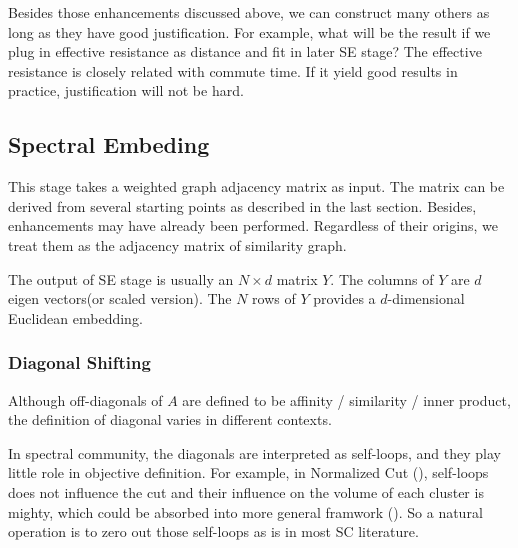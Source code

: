 
Besides those enhancements discussed above, we can construct many others
as long as they have good justification. 
For example, what will be the result if we plug in effective 
resistance as distance and fit in later SE stage? The effective 
resistance is closely related with commute time\cite{lau-2012-spectral-ln}. 
If it yield good results in practice, justification will not 
be hard. 



\subsection{Spectral Embeding}
\label{sec:se}

This stage takes a weighted graph adjacency matrix as input. 
The matrix can be derived from several starting points as 
described in the last section. Besides, enhancements may 
have already been performed. Regardless of their origins, 
we treat them as the adjacency matrix of similarity graph. 

The output of SE stage is usually an $ N \times d $ matrix $ Y $.
The columns of $ Y $ are $ d $ eigen vectors(or scaled version). 
The $ N $ rows of $ Y $ provides a $ d $-dimensional Euclidean 
embedding. 

\subsubsection{Diagonal Shifting}
\label{sec:diags}

Although off-diagonals of $A$ are defined to be affinity / similarity / 
inner product, the definition of diagonal varies in different contexts. 

In spectral community, the diagonals are interpreted as self-loops, 
and they play little role in objective definition. For example, 
in Normalized Cut (\rsec{\ref{sec:ncut}}), self-loops does not 
influence the cut and their influence on the volume of each cluster 
is mighty, which could be absorbed into more general framwork
(\rsec{\ref{sec:wcut}}). So a natural operation is to zero out
those self-loops as is in most SC literature. 

